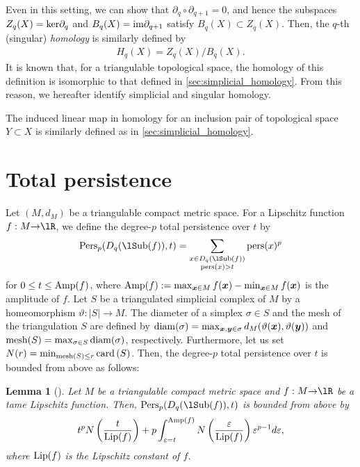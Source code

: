 \documentclass{article}
\newtheorem{lem}[thm]{Lemma}
\newcommand{\ee}{{\varepsilon}}
\newcommand{\ra}{{\rightarrow}}
\newcommand{\Sub}{{\rm {\lS}ub}}
\newcommand{\Pers}{{\rm Pers}}
\newcommand{\pers}{{\rm pers}}
\newcommand{\Lip}{{\rm Lip}}
\newcommand{\Amp}{{\rm Amp}}
\newcommand{\diam}{{\rm diam}}
\newcommand{\mesh}{{\rm mesh}}
\providecommand{\abs}[1]{\left\lvert#1\right\rvert}
\providecommand{\pare}[1]{\left( #1 \right)}
\providecommand{\card}[1]{{\rm card}\pare{#1}}
\begin{document}
Even in this setting, we can show that $\partial_{q}\circ\partial_{q+1}=0$, and hence the subspaces $Z_q(X)={\rm ker}\partial_q$ and $B_q(X)={\rm im}\partial_{q+1}$ satisfy $B_q(X)\subset Z_q(X)$. Then, the $q$-th (singular) {\em homology} is similarly defined by 
\begin{align*}
H_q(X)=Z_q(X)/B_q(X).
\end{align*}
It is known that, for a triangulable topological space, the homology of this definition is isomorphic to that defined in 
\ref{sec:simplicial_homology}. From this reason, we hereafter identify simplicial and singular homology. 

The induced linear map in homology for an inclusion pair of topological space $Y\subset X$ is similarly defined as in \ref{sec:simplicial_homology}. 




\section{Total persistence}
\label{sec:total}

Let $(M,d_{M})$ be a triangulable compact metric space.
For a Lipschitz function $f:M \ra \lR$, we define the degree-$p$ total persistence over $t$ by 
\begin{equation*}
\Pers_{p}(D_{q}(\Sub(f)),t)=\sum_{\substack{x \in D_{q}(\Sub(f)) \\ \pers(x)>t}} \pers(x)^{p} 
\end{equation*}
for $0 \leq t \leq \Amp(f)$, where $\Amp(f) := \max_{\bm{x} \in M}f(\bm{x})-\min_{\bm{x} \in M} f(\bm{x})$ is the amplitude of $f$.
Let $S$ be a triangulated simplicial complex of $M$ by a homeomorphism $\vartheta: \abs{S} \ra M$.
The diameter of a simplex $\sigma \in S$ and the mesh of the triangulation $S$ are defined by $\diam(\sigma) = \max_{\bm{x},\bm{y} \in \sigma} d_{M}(\vartheta(\bm{x}),\vartheta(\bm{y}))$ and $\mesh(S) = \max_{\sigma \in S} \diam(\sigma )$, respectively.
Furthermore, let us set $N(r)= \min_{\mesh(S ) \leq r} \card{S}$.
Then, the degree-$p$ total persistence over $t$ is bounded from above as follows:
\begin{lem}[\cite{CEHM10}]
Let $M$ be a triangulable compact metric space and $f:M \ra \lR$ be a tame Lipschitz function.
Then, $\Pers_{p}(D_{q}(\Sub(f)),t)$ is bounded from above by
\[
t^{p}N \pare{\frac{t}{\Lip(f)}} + p \int^{\Amp(f)}_{\ee=t} N \pare{\frac{\ee}{\Lip(f)}} \ee^{p-1}d\ee,
\]
where $\Lip(f)$ is the Lipschitz constant of $f$.
\end{lem}
\end{document}
